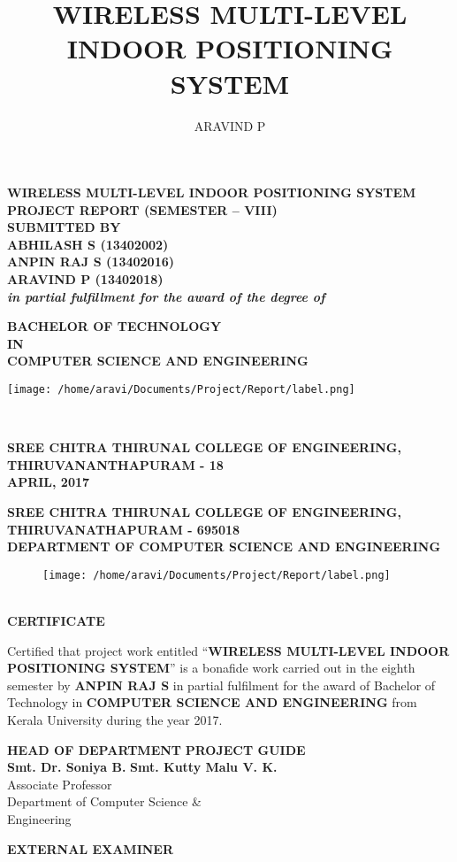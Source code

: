 \documentclass[a4paper,12pt]{report}
\title{WIRELESS MULTI-LEVEL INDOOR POSITIONING SYSTEM}
\author{ARAVIND P}
\newcommand*{\plogo}{
    \texttt{[image: /home/aravi/Documents/Project/Report/label.png]} %
    \iffalse
      \texttt{[image: /home/aravi/Documents/Project/Report/label.png]} %
    \fi
}
\newcommand*{\titleGP}{\begingroup %
\centering %
\vspace*{-25pt} %

\textbf{
{\LARGE WIRELESS MULTI-LEVEL INDOOR POSITIONING SYSTEM}\\[\baselineskip] %
}
\textbf{PROJECT REPORT (SEMESTER – VIII)}\\
[\baselineskip]
\textbf{SUBMITTED BY}\\
[\baselineskip]
\textbf{ABHILASH S (13402002)}\\
\textbf{ANPIN RAJ S (13402016)}\\
\textbf{ARAVIND P (13402018)}\\
[\baselineskip]
\textbf{\textit{in partial fulfillment for the award of the degree of}}\\
[\baselineskip]



{\Large \textbf{BACHELOR OF TECHNOLOGY} \\ \textbf{IN} \\ \textbf{COMPUTER SCIENCE AND ENGINEERING}\\ \par} %


\vspace*{1cm}%

\plogo \\[0.1\baselineskip] %

\vspace*{1cm}

{\large \textbf{SREE CHITRA THIRUNAL COLLEGE OF ENGINEERING,}\\
\textbf{THIRUVANANTHAPURAM - 18}\\
\textbf{APRIL, 2017}\\[\baselineskip]}\par %
\newpage
\endgroup}
\begin{document}
 

\pagestyle{empty} %
\titleGP %


\begin{center}
  \textbf{\large SREE CHITRA THIRUNAL COLLEGE OF ENGINEERING,}\\
  
  \textbf{THIRUVANATHAPURAM - 695018}\\

  \textbf{DEPARTMENT OF COMPUTER SCIENCE AND ENGINEERING}
  \newline
  \begin{figure}[h!]
    \begin{center}
    	\plogo
    \end{center}
  \end{figure}
  \\[0.3\baselineskip]
  
  \Large \textbf{CERTIFICATE}\\
  [\baselineskip]
  \end{center}
  \par 
  Certified that project work entitled “\textbf{WIRELESS MULTI-LEVEL INDOOR POSITIONING SYSTEM}” is a bonafide work carried out in the eighth semester by \textbf{ANPIN RAJ S} in partial fulfilment for the award of Bachelor of Technology in \textbf{COMPUTER SCIENCE AND ENGINEERING} from Kerala University during the year 2017.

  \vspace{2cm}
  
  \begin{flushleft}
  	\textbf{HEAD OF DEPARTMENT} \hspace{3.5cm}\textbf{PROJECT GUIDE} \\
  	\textbf{Smt. Dr. Soniya B.} \hspace{5.25cm}\textbf{Smt. Kutty Malu V. K. } \\
  	{Associate Professor} \hspace{5.8cm}{Assistant Professor} \\
  	{Department of Computer Science \& \hspace{2.8cm}{Department of Computer Science \&}} \\
  	{Engineering} \hspace{7.15cm}{Engineering}
  \end{flushleft}
  
  \vspace{2cm}
  
  \begin{center}
	  \textbf{EXTERNAL EXAMINER}
  \end{center}
\end{document}

